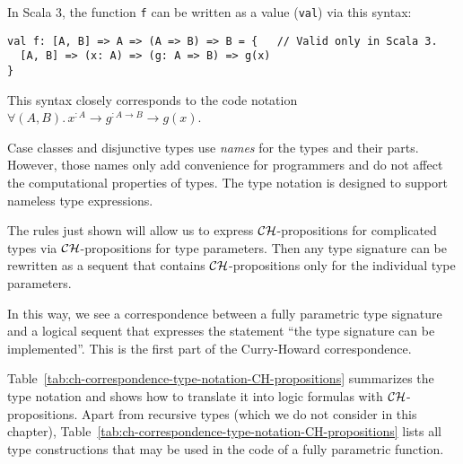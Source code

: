 In Scala 3, the function \lstinline!f! can be written as a value
(\lstinline!val!) via this syntax:
\begin{lstlisting}
val f: [A, B] => A => (A => B) => B = {   // Valid only in Scala 3.
  [A, B] => (x: A) => (g: A => B) => g(x)
}
\end{lstlisting}
This syntax closely corresponds to the code notation $\forall(A,B).\,x^{:A}\rightarrow g^{:A\rightarrow B}\rightarrow g(x)$.

Case classes and disjunctive types use \emph{names} for the types
and their parts. However, those names only add convenience for programmers
and do not affect the computational properties of types. The type
notation is designed to support nameless type expressions.

The rules just shown will allow us to express ${\cal CH}$-propositions
for complicated types via ${\cal CH}$-propositions for type parameters.
Then any type signature can be rewritten as a sequent that contains
${\cal CH}$-propositions only for the individual type parameters. 

In this way, we see a correspondence between a fully parametric type
signature and a logical sequent that expresses the statement \textsf{``}the
type signature can be implemented\textsf{''}. This is the first part of the
Curry-Howard correspondence.

Table~\ref{tab:ch-correspondence-type-notation-CH-propositions}
summarizes the type notation and shows how to translate it into logic
formulas with ${\cal CH}$-propositions. Apart from recursive types
(which we do not consider in this chapter), Table~\ref{tab:ch-correspondence-type-notation-CH-propositions}
lists all type constructions that may be used in the code of a fully
parametric function.

